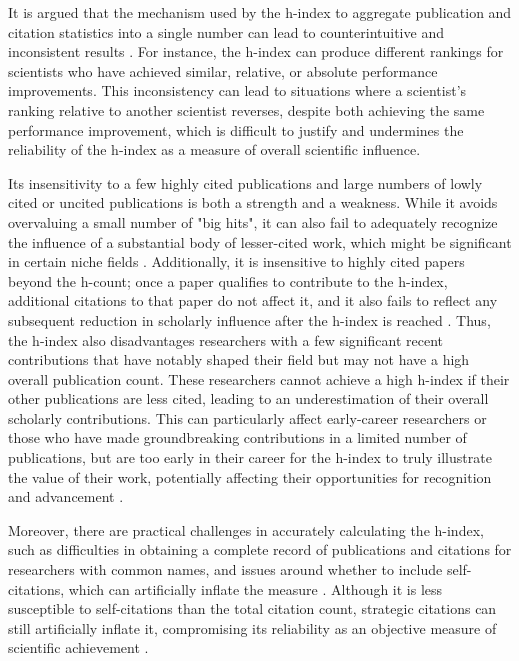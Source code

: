 It is argued that the mechanism used by the h-index to aggregate publication
and citation statistics into a single number can lead to counterintuitive and
inconsistent results \cite{waltman2012inconsistency}. For instance, the h-index
can produce different rankings for scientists who have achieved similar,
relative, or absolute performance improvements. This inconsistency can lead to
situations where a scientist’s ranking relative to another scientist reverses,
despite both achieving the same performance improvement, which is difficult to
justify and undermines the reliability of the h-index as a measure of overall
scientific influence.

Its insensitivity to a few highly cited publications and large numbers of lowly
cited or uncited publications is both a strength and a weakness. While it
avoids overvaluing a small number of "big hits", it can also fail to adequately
recognize the influence of a substantial body of lesser-cited work, which might
be significant in certain niche fields
\cite{hirsch2005index,costas2007h,waltman2012inconsistency,norris2010h,egghe2010hirsch}.
Additionally, it is insensitive to highly cited papers beyond the h-count; once
a paper qualifies to contribute to the h-index, additional citations to that
paper do not affect it, and it also fails to reflect any subsequent reduction
in scholarly influence after the h-index is reached
\cite{hirsch2005index,bornmann2007what,waltman2012inconsistency,norris2010h,egghe2010hirsch,hirsch2014meaning}.
Thus, the h-index also disadvantages researchers with a few significant recent
contributions that have notably shaped their field but may not have a high
overall publication count. These researchers cannot achieve a high h-index if
their other publications are less cited, leading to an underestimation of their
overall scholarly contributions. This can particularly affect early-career
researchers or those who have made groundbreaking contributions in a limited
number of publications, but are too early in their career for the h-index to
truly illustrate the value of their work, potentially affecting their
opportunities for recognition and advancement
\cite{hirsch2005index,bornmann2007what,costas2007h,waltman2012inconsistency,norris2010h,egghe2010hirsch,hirsch2014meaning}.

Moreover, there are practical challenges in accurately calculating the h-index,
such as difficulties in obtaining a complete record of publications and
citations for researchers with common names, and issues around whether to
include self-citations, which can artificially inflate the measure
\cite{costas2007h,norris2010h,bartneck2011detecting}. Although it is less
susceptible to self-citations than the total citation count, strategic
citations can still artificially inflate it, compromising its reliability as an
objective measure of scientific achievement
\cite{hirsch2005index,bornmann2007what,costas2007h,waltman2012inconsistency,norris2010h,egghe2010hirsch,hirsch2014meaning,bartneck2011detecting}.


